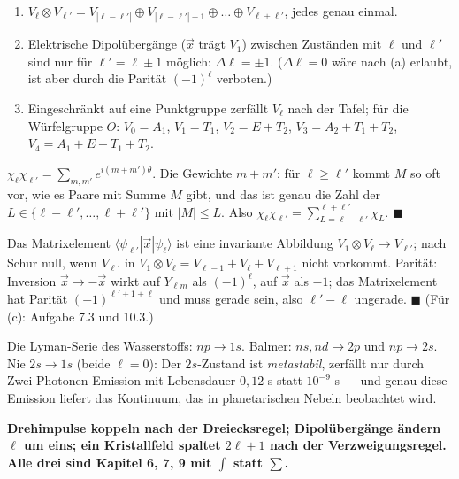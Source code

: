 \begin{merksatz}
\begin{enumerate}[label=(\alph*), leftmargin=1.6em]
\item $V_\ell\otimes V_{\ell'} = V_{|\ell - \ell'|}\oplus V_{|\ell - \ell'| + 1}\oplus\dots\oplus V_{\ell + \ell'}$, jedes genau einmal.
\item Elektrische Dipolübergänge ($\vec x$ trägt $V_1$) zwischen Zuständen mit $\ell$ und $\ell'$ sind nur für $\ell' = \ell\pm1$ möglich: $\Delta\ell = \pm1$. ($\Delta\ell = 0$ wäre nach (a) erlaubt, ist aber durch die Parität $(-1)^{\ell}$ verboten.)
\item Eingeschränkt auf eine Punktgruppe zerfällt $V_\ell$ nach der Tafel; für die Würfelgruppe $O$: $V_0 = A_1$, $V_1 = T_1$, $V_2 = E + T_2$, $V_3 = A_2 + T_1 + T_2$, $V_4 = A_1 + E + T_1 + T_2$.
\end{enumerate}

$\chi_\ell\chi_{\ell'} = \sum_{m, m'}e^{i(m + m')\theta}$. Die Gewichte $m + m'$: für $\ell\ge\ell'$ kommt $M$ so oft vor, wie es Paare mit Summe $M$ gibt, und das ist genau die Zahl der $L\in\{\ell - \ell', \dots, \ell + \ell'\}$ mit $|M|\le L$. Also $\chi_\ell\chi_{\ell'} = \sum_{L = \ell - \ell'}^{\ell + \ell'}\chi_L$. $\blacksquare$

Das Matrixelement $\langle\psi_{\ell'}|\vec x|\psi_\ell\rangle$ ist eine invariante Abbildung $V_1\otimes V_\ell\to V_{\ell'}$; nach Schur null, wenn $V_{\ell'}$ in $V_1\otimes V_\ell = V_{\ell - 1} + V_\ell + V_{\ell + 1}$ nicht vorkommt. Parität: Inversion $\vec x\to-\vec x$ wirkt auf $Y_{\ell m}$ als $(-1)^{\ell}$, auf $\vec x$ als $-1$; das Matrixelement hat Parität $(-1)^{\ell' + 1 + \ell}$ und muss gerade sein, also $\ell' - \ell$ ungerade. $\blacksquare$ (Für (c): Aufgabe 7.3 und 10.3.)

Die Lyman-Serie des Wasserstoffs: $np\to1s$. Balmer: $ns, nd\to2p$ und $np\to2s$. Nie $2s\to1s$ (beide $\ell = 0$): Der $2s$-Zustand ist \emph{metastabil}, zerfällt nur durch Zwei-Photonen-Emission mit Lebensdauer $0{,}12$ s statt $10^{-9}$ s --- und genau diese Emission liefert das Kontinuum, das in planetarischen Nebeln beobachtet wird.

\begin{center}
\begin{minipage}{0.9\textwidth}
\textbf{Drehimpulse koppeln nach der Dreiecksregel; Dipolübergänge ändern $\ell$ um eins; ein Kristallfeld spaltet $2\ell + 1$ nach der Verzweigungsregel. Alle drei sind Kapitel 6, 7, 9 mit $\int$ statt $\sum$.}
\end{minipage}
\end{center}
\end{merksatz}

